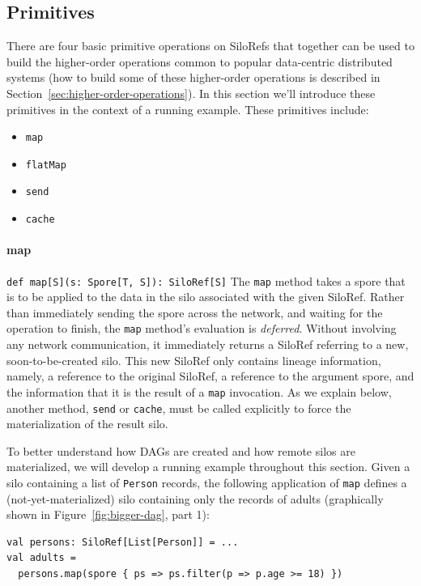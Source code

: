 \documentclass[10pt]{sigplanconf}
\theoremstyle{definition}
\theoremstyle{definition}
\begin{document}
\subsection{Primitives}
\label{sec:primitives}

There are four basic primitive operations on SiloRefs that together can be used
to build the higher-order operations common to popular data-centric distributed
systems (how to build some of these higher-order operations is described in
Section~\ref{sec:higher-order-operations}). In this section we'll introduce
these primitives in the context of a running example. These primitives include:

\begin{itemize}[noitemsep,nolistsep]
\item \verb|map|
\item \verb|flatMap|
\item \verb|send|
\item \verb|cache|
\end{itemize}

\paragraph{map}%
%
\texttt{def map[S](s: Spore[T, S]): SiloRef[S]} \newline
%
The \verb|map| method takes a spore that is to be applied to the data in the
silo associated with the given SiloRef. Rather than immediately sending the
spore across the network, and waiting for the operation to finish, the
\verb|map| method's evaluation is \emph{deferred}. Without involving any network
communication, it immediately returns a SiloRef referring to a new,
soon-to-be-created silo. This new SiloRef only contains lineage information,
namely, a reference to the original SiloRef, a reference to the argument spore,
and the information that it is the result of a \verb|map| invocation. As we
explain below, another method, \verb|send| or \verb|cache|, must be called
explicitly to force the materialization of the result silo.

To better understand how DAGs are created and how remote silos are
materialized, we will develop a running example throughout this section. Given
a silo containing a list of \verb|Person| records, the following application of
\verb|map| defines a (not-yet-materialized) silo containing only the records of
adults (graphically shown in Figure~\ref{fig:bigger-dag}, part 1):

\begin{lstlisting}
val persons: SiloRef[List[Person]] = ...
val adults =
  persons.map(spore { ps => ps.filter(p => p.age >= 18) })
\end{lstlisting}
\end{document}
